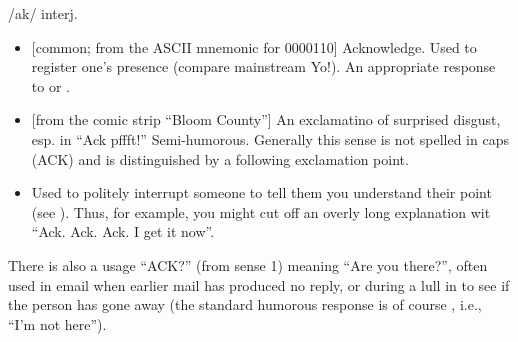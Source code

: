  /ak/ interj.

\begin{itemize}
	\item {[}common; from the ASCII mnemonic for 0000110] Acknowledge. Used to register one's presence (compare mainstream Yo!). An
		appropriate response to  or .
	\item {[}from the comic strip ``Bloom County''] An exclamatino of surprised disgust, esp. in ``Ack pffft!'' Semi-humorous. Generally
		this sense is not spelled in caps (ACK) and is distinguished by a following exclamation point.
	\item Used to politely interrupt someone to tell them you understand their point (see ). Thus, for example, you might cut
		off an overly long explanation wit ``Ack. Ack. Ack. I get it now''.
\end{itemize}

There is also a usage ``ACK?'' (from sense 1) meaning ``Are you there?'', often used in email when earlier mail has produced no reply, or
during a lull in  to see if the person has gone away (the standard humorous response is of course ,
i.e., ``I'm not here'').

